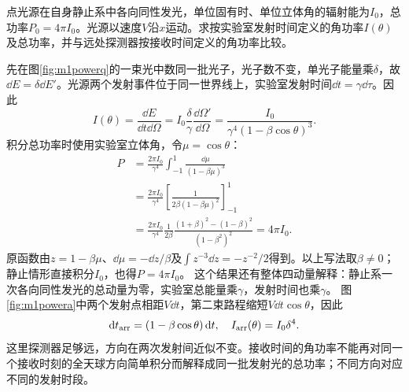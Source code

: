 \begin{example}\label{ex:m1power}
点光源在自身静止系中各向同性发光，单位固有时、单位立体角的辐射能为$I_0$，总功率$P_0=4\pi I_0$。光源以速度$V$沿$x$运动。求按实验室发射时间定义的角功率$I(\theta)$及总功率，并与远处探测器按接收时间定义的角功率比较。
\end{example}
\begin{solution}
先在图\ref{fig:m1powerq}的一束光中数同一批光子，光子数不变，单光子能量乘$\delta$，故$\dd E=\delta\dd E'$。光源两个发射事件位于同一世界线上，实验室发射时间$\dd t=\gamma\dd\tau$。因此
\begin{equation}\label{eq:m1angular}
 I(\theta)=\frac{\dd E}{\dd t\dd\Omega}
 =I_0\frac\delta\gamma\frac{\dd\Omega'}{\dd\Omega}
 =\frac{I_0}{\gamma^4(1-\beta\cos\theta)^3}.
\end{equation}
积分总功率时使用实验室立体角，令$\mu=\cos\theta$：
\begin{align*}
 P&=\frac{2\pi I_0}{\gamma^4}\int_{-1}^{1}\frac{\dd\mu}{(1-\beta\mu)^3}\\
 &=\frac{2\pi I_0}{\gamma^4}
 \left[\frac{1}{2\beta(1-\beta\mu)^2}\right]_{-1}^{1}\\
 &=\frac{2\pi I_0}{\gamma^4}\frac1{2\beta}
 \frac{(1+\beta)^2-(1-\beta)^2}{(1-\beta^2)^2}
 =4\pi I_0.
\end{align*}
原函数由$z=1-\beta\mu$、$\dd\mu=-\dd z/\beta$及$\int z^{-3}\dd z=-z^{-2}/2$得到。以上写法取$\beta\ne0$；静止情形直接积分$I_0$，也得$P=4\pi I_0$。
这个结果还有整体四动量解释：静止系一次各向同性发光的总动量为零，实验室总能量乘$\gamma$，发射时间也乘$\gamma$。
图\ref{fig:m1powera}中两个发射点相距$V\dd t$，第二束路程缩短$V\dd t\cos\theta$，因此
\[
 \mathop{}\!\mathrm d t_{\rm arr}=(1-\beta\cos\theta)\mathop{}\!\mathrm d t,
 \quad I_{\rm arr}(\theta)=I_0\delta^4.
\]
这里探测器足够远，方向在两次发射间近似不变。接收时间的角功率不能再对同一个接收时刻的全天球方向简单积分而解释成同一批发射光的总功率；不同方向对应不同的发射时段。
\end{solution}





